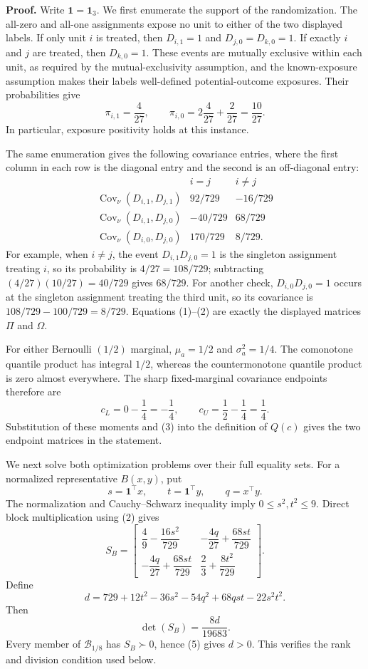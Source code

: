 \textbf{Proof.}
Write \(\mathbf 1=\mathbf 1_3\).  We first enumerate the support of the
randomization.  The all-zero and all-one assignments expose no unit to either
of the two displayed labels.  If only unit \(i\) is treated, then
\(D_{i,1}=1\) and \(D_{j,0}=D_{k,0}=1\).  If exactly \(i\) and \(j\) are
treated, then \(D_{k,0}=1\).  These events are mutually exclusive within each
unit, as required by the mutual-exclusivity assumption, and the known-exposure
assumption makes their labels well-defined potential-outcome exposures.  Their
probabilities give
\[
 \pi_{i,1}=\frac4{27},
 \qquad
 \pi_{i,0}=2\frac4{27}+\frac2{27}=\frac{10}{27}.
 \tag{1}
\]
In particular, exposure positivity holds at this instance.

The same enumeration gives the following covariance entries, where the first
column in each row is the diagonal entry and the second is an off-diagonal
entry:
\[
\begin{array}{c|cc}
 &i=j&i\ne j\\ \hline
 \operatorname{Cov}_{\nu}(D_{i,1},D_{j,1})&92/729&-16/729\\
 \operatorname{Cov}_{\nu}(D_{i,1},D_{j,0})&-40/729&68/729\\
 \operatorname{Cov}_{\nu}(D_{i,0},D_{j,0})&170/729&8/729.
\end{array}
\tag{2}
\]
For example, when \(i\ne j\), the event
\(D_{i,1}D_{j,0}=1\) is the singleton assignment treating \(i\), so its
probability is \(4/27=108/729\); subtracting
\((4/27)(10/27)=40/729\) gives \(68/729\).  For another check,
\(D_{i,0}D_{j,0}=1\) occurs at the singleton assignment treating the third
unit, so its covariance is \(108/729-100/729=8/729\).  Equations (1)--(2)
are exactly the displayed matrices \(\Pi\) and \(\Omega\).

For either Bernoulli \((1/2)\) marginal,
\(\mu_a=1/2\) and \(\sigma_a^2=1/4\).  The comonotone quantile product has
integral \(1/2\), whereas the countermonotone quantile product is zero almost
everywhere.  The sharp fixed-marginal covariance endpoints therefore are
\[
 c_L=0-\frac14=-\frac14,
 \qquad
 c_U=\frac12-\frac14=\frac14.
 \tag{3}
\]
Substitution of these moments and (3) into the definition of \(Q(c)\) gives
the two endpoint matrices in the statement.

We next solve both optimization problems over their full equality sets.  For a
normalized representative \(B(x,y)\), put
\[
 s=\mathbf1^{\top}x,
 \qquad
 t=\mathbf1^{\top}y,
 \qquad
 q=x^{\top}y.
\]
The normalization and Cauchy--Schwarz inequality imply
\(0\le s^2,t^2\le9\).  Direct block multiplication using (2) gives
\[
 S_B=
 \begin{bmatrix}
  \dfrac49-\dfrac{16s^2}{729}&
  -\dfrac{4q}{27}+\dfrac{68st}{729}\\[4pt]
  -\dfrac{4q}{27}+\dfrac{68st}{729}&
  \dfrac23+\dfrac{8t^2}{729}
 \end{bmatrix}.
 \tag{4}
\]
Define
\[
 d=729+12t^2-36s^2-54q^2+68qst-22s^2t^2.
\]
Then
\[
 \det(S_B)=\frac{8d}{19683}.
 \tag{5}
\]
Every member of \(\mathcal B_{1/8}\) has \(S_B\succ0\), hence (5) gives
\(d>0\).  This verifies the rank and division condition used below.

